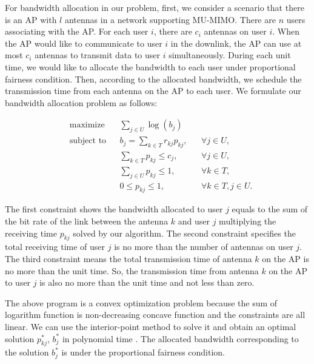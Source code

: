 	For bandwidth allocation in our problem, first, we consider a scenario that there is an AP with $l$ antennas in a network supporting MU-MIMO. There are $n$ users associating with the AP. For each user $i$, there are $c_i$ antennas on user $i$. When the AP would like to communicate to user $i$ in the downlink, the AP can use at most $c_i$ antennas to transmit data to user $i$ simultaneously. During each unit time, we would like to allocate the bandwidth to each user under proportional fairness condition. Then, according to the allocated bandwidth, we schedule the transmission time from each antenna on the AP to each user. We formulate our bandwidth allocation problem as follows:

	\begin{equation*}
		\begin{aligned}
			& \text{maximize} 
			& & \sum_{j \in U} \log ( b_{j} ) \\
			& \text{subject to} 
			& & b_{j} = \sum_{k \in T} r_{kj}p_{kj}, & & \forall j \in U,\\
			& & & \sum_{k\in T} p_{kj} \le c_{j}, & &  \forall j \in U, \\
			& & & \sum_{j\in U} p_{kj} \le 1, & & \forall k \in T,  \\
			& & & 0 \le p_{kj} \le 1, & & \forall k \in T, j \in U.
		\end{aligned}
	\end{equation*}

	The first constraint shows the bandwidth allocated to user $j$ equals to the sum of the bit rate of the link between the antenna  $k$ and user $j$ multiplying the receiving time $p_{kj}$ solved by our algorithm. The second constraint specifies the total receiving time of user $j$ is no more than the number of antennas on user $j$. The third constraint means the total transmission time of antenna $k$ on the AP is no more than the unit time. So, the transmission time from antenna $k$ on the AP to user $j$ is also no more than the unit time and not less than zero.

	The above program is a convex optimization problem because the sum of logarithm function is non-decreasing concave function and the constraints are all linear. We can use the interior-point method to solve it and obtain an optimal solution $p_{kj}^*$, $b_j^*$ in polynomial time \cite{boyd2004convex}. The allocated bandwidth corresponding to the solution $b_j^*$ is under the proportional fairness condition.
